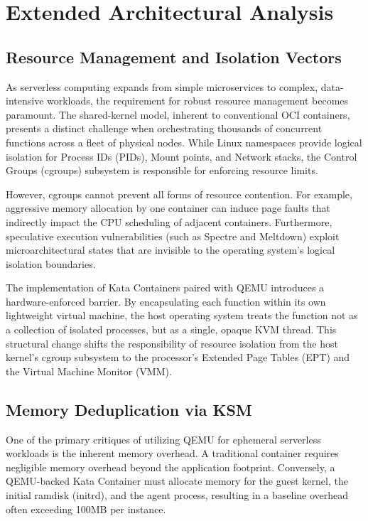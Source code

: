 \documentclass[12pt,a4paper]{report}
\begin{document}
\section{Extended Architectural Analysis}
\subsection{Resource Management and Isolation Vectors}
As serverless computing expands from simple microservices to complex, data-intensive workloads, the requirement for robust resource management becomes paramount. The shared-kernel model, inherent to conventional OCI containers, presents a distinct challenge when orchestrating thousands of concurrent functions across a fleet of physical nodes. While Linux namespaces provide logical isolation for Process IDs (PIDs), Mount points, and Network stacks, the Control Groups (cgroups) subsystem is responsible for enforcing resource limits.

However, cgroups cannot prevent all forms of resource contention. For example, aggressive memory allocation by one container can induce page faults that indirectly impact the CPU scheduling of adjacent containers. Furthermore, speculative execution vulnerabilities (such as Spectre and Meltdown) exploit microarchitectural states that are invisible to the operating system's logical isolation boundaries.

The implementation of Kata Containers paired with QEMU introduces a hardware-enforced barrier. By encapsulating each function within its own lightweight virtual machine, the host operating system treats the function not as a collection of isolated processes, but as a single, opaque KVM thread. This structural change shifts the responsibility of resource isolation from the host kernel's cgroup subsystem to the processor's Extended Page Tables (EPT) and the Virtual Machine Monitor (VMM).

\subsection{Memory Deduplication via KSM}
One of the primary critiques of utilizing QEMU for ephemeral serverless workloads is the inherent memory overhead. A traditional container requires negligible memory overhead beyond the application footprint. Conversely, a QEMU-backed Kata Container must allocate memory for the guest kernel, the initial ramdisk (initrd), and the agent process, resulting in a baseline overhead often exceeding 100MB per instance.
\end{document}
